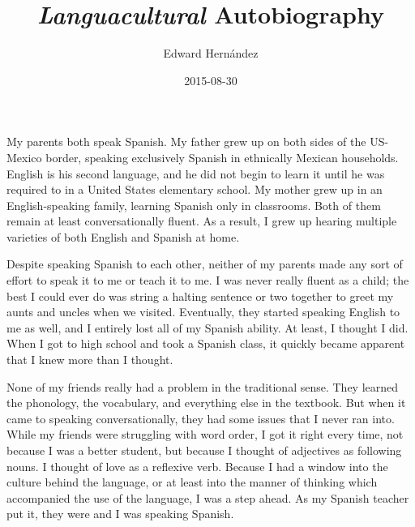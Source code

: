 \documentclass[doc,12pt]{apa6}
\begin{document}
\title{\textit{Languacultural} Autobiography}
\author{Edward Hern\'{a}ndez}
\date{2015-08-30}
\maketitle



My parents both speak Spanish. My father grew up on both sides of the US-Mexico
border, speaking exclusively Spanish in ethnically Mexican households. English
is his second language, and he did not begin to learn it until he was required
to in a United States elementary school. My mother grew up in an
English-speaking family, learning Spanish only in classrooms. Both of them
remain at least conversationally fluent. As a result, I grew up hearing
multiple varieties of both English and Spanish at home.

Despite speaking Spanish to each other, neither of my parents made any sort of
effort to speak it to me or teach it to me. I was never really fluent as a
child; the best I could ever do was string a halting sentence or two together
to greet my aunts and uncles when we visited. Eventually, they started speaking
English to me as well, and I entirely lost all of my Spanish ability. At least,
I thought I did. When I got to high school and took a Spanish class, it quickly
became apparent that I knew more than I thought.

None of my friends really had a problem  in the
traditional sense.  They learned the phonology, the vocabulary, and everything
else in the textbook. But when it came to speaking conversationally, they had
some issues that I never ran into.  While my friends were struggling with word
order, I got it right every time, not because I was a better student, but
because I thought of adjectives as following nouns. I thought of love as a
reflexive verb. Because I had a window into the culture behind the language, or
at least into the manner of thinking which accompanied the use of the language,
I was a step ahead. As my Spanish teacher put it, they were  and I was speaking Spanish.
\end{document}
